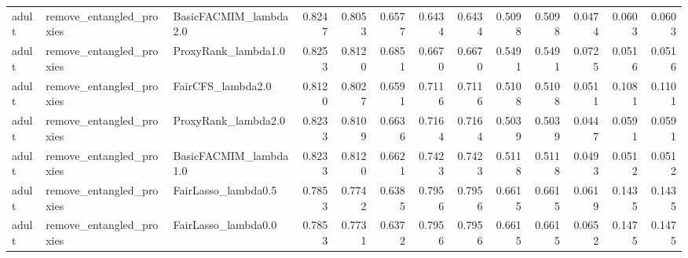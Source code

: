\begin{tabular}{lllrrrrrrrrrr}
adult & remove_entangled_proxies & BasicFACMIM_lambda2.0 & 0.8247 & 0.8053 & 0.6577 & 0.6434 & 0.6434 & 0.5098 & 0.5098 & 0.0474 & 0.0603 & 0.0603 \\
adult & remove_entangled_proxies & ProxyRank_lambda1.0 & 0.8253 & 0.8120 & 0.6851 & 0.6670 & 0.6670 & 0.5491 & 0.5491 & 0.0725 & 0.0516 & 0.0516 \\
adult & remove_entangled_proxies & FairCFS_lambda2.0 & 0.8120 & 0.8027 & 0.6591 & 0.7116 & 0.7116 & 0.5108 & 0.5108 & 0.0511 & 0.1081 & 0.1101 \\
adult & remove_entangled_proxies & ProxyRank_lambda2.0 & 0.8233 & 0.8109 & 0.6636 & 0.7164 & 0.7164 & 0.5039 & 0.5039 & 0.0447 & 0.0591 & 0.0591 \\
adult & remove_entangled_proxies & BasicFACMIM_lambda1.0 & 0.8233 & 0.8120 & 0.6621 & 0.7423 & 0.7423 & 0.5118 & 0.5118 & 0.0493 & 0.0512 & 0.0512 \\
adult & remove_entangled_proxies & FairLasso_lambda0.5 & 0.7853 & 0.7742 & 0.6385 & 0.7956 & 0.7956 & 0.6615 & 0.6615 & 0.0619 & 0.1435 & 0.1435 \\
adult & remove_entangled_proxies & FairLasso_lambda0.0 & 0.7853 & 0.7731 & 0.6372 & 0.7956 & 0.7956 & 0.6615 & 0.6615 & 0.0652 & 0.1475 & 0.1475 \\
\bottomrule
\end{tabular}
